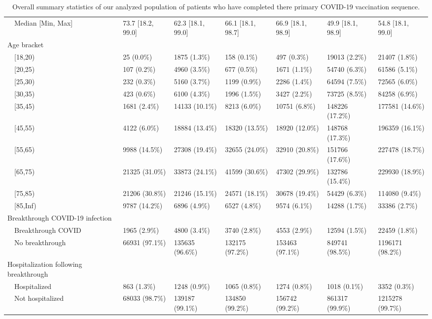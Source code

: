 \begin{table}[!htbp]
\begin{tabular}{lllllll}
    Median [Min, Max] & 73.7 [18.2, 99.0] & 62.3 [18.1, 99.0] & 66.1 [18.1, 98.7] & 66.9 [18.1, 98.9] & 49.9 [18.1, 98.9] & 54.8 [18.1, 99.0] \\ 
  Age bracket &  &  &  &  &  &  \\ 
    [18,20) & 25 (0.0\%) & 1875 (1.3\%) & 158 (0.1\%) & 497 (0.3\%) & 19013 (2.2\%) & 21407 (1.8\%) \\ 
    [20,25) & 107 (0.2\%) & 4960 (3.5\%) & 677 (0.5\%) & 1671 (1.1\%) & 54740 (6.3\%) & 61586 (5.1\%) \\ 
    [25,30) & 232 (0.3\%) & 5160 (3.7\%) & 1199 (0.9\%) & 2286 (1.4\%) & 64594 (7.5\%) & 72565 (6.0\%) \\ 
    [30,35) & 423 (0.6\%) & 6100 (4.3\%) & 1996 (1.5\%) & 3427 (2.2\%) & 73725 (8.5\%) & 84258 (6.9\%) \\ 
    [35,45) & 1681 (2.4\%) & 14133 (10.1\%) & 8213 (6.0\%) & 10751 (6.8\%) & 148226 (17.2\%) & 177581 (14.6\%) \\ 
    [45,55) & 4122 (6.0\%) & 18884 (13.4\%) & 18320 (13.5\%) & 18920 (12.0\%) & 148768 (17.3\%) & 196359 (16.1\%) \\ 
    [55,65) & 9988 (14.5\%) & 27308 (19.4\%) & 32655 (24.0\%) & 32910 (20.8\%) & 151766 (17.6\%) & 227478 (18.7\%) \\ 
    [65,75) & 21325 (31.0\%) & 33873 (24.1\%) & 41599 (30.6\%) & 47302 (29.9\%) & 132786 (15.4\%) & 229930 (18.9\%) \\ 
    [75,85) & 21206 (30.8\%) & 21246 (15.1\%) & 24571 (18.1\%) & 30678 (19.4\%) & 54429 (6.3\%) & 114080 (9.4\%) \\ 
    [85,Inf) & 9787 (14.2\%) & 6896 (4.9\%) & 6527 (4.8\%) & 9574 (6.1\%) & 14288 (1.7\%) & 33386 (2.7\%) \\ 
  Breakthrough COVID-19 infection &  &  &  &  &  &  \\ 
    Breakthrough COVID & 1965 (2.9\%) & 4800 (3.4\%) & 3740 (2.8\%) & 4553 (2.9\%) & 12594 (1.5\%) & 22459 (1.8\%) \\ 
    No breakthrough & 66931 (97.1\%) & 135635 (96.6\%) & 132175 (97.2\%) & 153463 (97.1\%) & 849741 (98.5\%) & 1196171 (98.2\%) \\ 
  Hospitalization following breakthrough &  &  &  &  &  &  \\ 
    Hospitalized & 863 (1.3\%) & 1248 (0.9\%) & 1065 (0.8\%) & 1274 (0.8\%) & 1018 (0.1\%) & 3352 (0.3\%) \\ 
    Not hospitalized & 68033 (98.7\%) & 139187 (99.1\%) & 134850 (99.2\%) & 156742 (99.2\%) & 861317 (99.9\%) & 1215278 (99.7\%) \\ 
   \hline
\end{tabular}
\caption{Overall summary statistics of our analyzed population of patients who have completed there primary COVID-19 vaccination sequence.} 
\label{tab:table_1}
\end{table}
